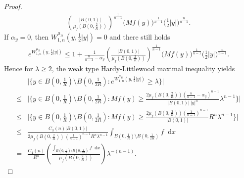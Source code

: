 \documentclass[12pt]{amsart}
\theoremstyle{plain}
\theoremstyle{definition}
\theoremstyle{remark}     %
\numberwithin{equation}{section}
\newcommand{\dx}{\mathop{}\!\mathrm{d}x}
\begin{document}
\begin{proof}
\begin{align*}
        \left(\frac{|B(0,1)|}{\mu_f(B(0,\frac{2}{R}))}\right)^{\frac{1}{n-1}}
        \Big(Mf(y)\Big)^{\frac{1}{n-1}}
        \Big(\frac{1}{2}|y|\Big)^{\frac{n}{n-1}}.
    \end{align*}
    If $\alpha_y=0$, then $W_{1,n}^{\mu_R}(y,\frac{1}{2}|y|)=0$ and there still holds
    \begin{align*}
        e^{W_{1,n}^{\mu_R}(y,\frac{1}{2}|y|)}
        \leq 1
        +\frac{1}{\frac{n}{n-1}-\alpha_y}
        \left(\frac{|B(0,1)|}{\mu_f(B(0,\frac{2}{R}))}\right)^{\frac{1}{n-1}}
        \Big(Mf(y)\Big)^{\frac{1}{n-1}}
        \Big(\frac{1}{2}|y|\Big)^{\frac{n}{n-1}}.
    \end{align*}
    Hence for $\lambda\geq 2$, the weak type Hardy-Littlewood maximal inequality yields
    \begin{align*}
        &\Big|\Big\{
        y\in B(0,\frac{1}{R})\setminus B(0,\frac{1}{2R}):
        e^{W_{1,n}^{\mu_R}(y,\frac{1}{2}|y|)}\geq \lambda
        \Big\}\Big|\\
        \leq& 
        \bigg|\bigg\{
        y\in B(0,\frac{1}{R})\setminus B(0,\frac{1}{2R}):
        Mf(y)\geq \frac{2\mu_f(B(0,\frac{2}{R}))(\frac{n}{n-1}-\alpha_y)^{n-1}}{|B(0,1)|\ |y|^n}\lambda^{n-1}
        \bigg\}\bigg|\\
        \leq&
        \bigg|\bigg\{
        y\in B(0,\frac{1}{R})\setminus B(0,\frac{1}{2R}):
        Mf(y)\geq \frac{2\mu_f(B(0,\frac{2}{R}))(\frac{1}{n-1})^{n-1}}{|B(0,1)|}R^n\lambda^{n-1}
       \bigg\}\bigg|\\
        \leq&
        \frac{C_3(n)|B(0,1)|}{2\mu_f(B(0,\frac{2}{R}))\, (\frac{1}{n-1})^{n-1}R^n\lambda^{n-1}} 
        \int_{B(0,\frac{1}{R})\setminus B(0,\frac{1}{2R})} f\dx\\
        =& \frac{C_4(n)}{R^n}
        \left(\frac{\int_{B(0,\frac{1}{R})\setminus B(0,\frac{1}{2R})} f\dx}{\mu_f(B(0,\frac{2}{R}))}\right)
        \lambda^{-(n-1)}.
    \end{align*}


\end{proof}
\end{document}
